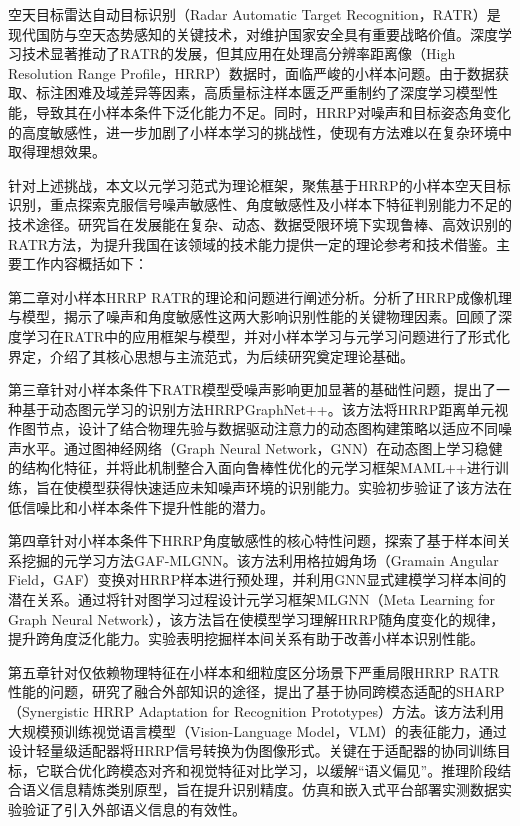 \begin{cabstract}
空天目标雷达自动目标识别（Radar Automatic Target Recognition，RATR）是现代国防与空天态势感知的关键技术，对维护国家安全具有重要战略价值。深度学习技术显著推动了RATR的发展，但其应用在处理高分辨率距离像（High Resolution Range Profile，HRRP）数据时，面临严峻的小样本问题。由于数据获取、标注困难及域差异等因素，高质量标注样本匮乏严重制约了深度学习模型性能，导致其在小样本条件下泛化能力不足。同时，HRRP对噪声和目标姿态角变化的高度敏感性，进一步加剧了小样本学习的挑战性，使现有方法难以在复杂环境中取得理想效果。

针对上述挑战，本文以元学习范式为理论框架，聚焦基于HRRP的小样本空天目标识别，重点探索克服信号噪声敏感性、角度敏感性及小样本下特征判别能力不足的技术途径。研究旨在发展能在复杂、动态、数据受限环境下实现鲁棒、高效识别的RATR方法，为提升我国在该领域的技术能力提供一定的理论参考和技术借鉴。主要工作内容概括如下：

第二章对小样本HRRP RATR的理论和问题进行阐述分析。分析了HRRP成像机理与模型，揭示了噪声和角度敏感性这两大影响识别性能的关键物理因素。回顾了深度学习在RATR中的应用框架与模型，并对小样本学习与元学习问题进行了形式化界定，介绍了其核心思想与主流范式，为后续研究奠定理论基础。

第三章针对小样本条件下RATR模型受噪声影响更加显著的基础性问题，提出了一种基于动态图元学习的识别方法HRRPGraphNet++。该方法将HRRP距离单元视作图节点，设计了结合物理先验与数据驱动注意力的动态图构建策略以适应不同噪声水平。通过图神经网络（Graph Neural Network，GNN）在动态图上学习稳健的结构化特征，并将此机制整合入面向鲁棒性优化的元学习框架MAML++进行训练，旨在使模型获得快速适应未知噪声环境的识别能力。实验初步验证了该方法在低信噪比和小样本条件下提升性能的潜力。

第四章针对小样本条件下HRRP角度敏感性的核心特性问题，探索了基于样本间关系挖掘的元学习方法GAF-MLGNN。该方法利用格拉姆角场（Gramain Angular Field，GAF）变换对HRRP样本进行预处理，并利用GNN显式建模学习样本间的潜在关系。通过将针对图学习过程设计元学习框架MLGNN（Meta Learning for Graph Neural Network），该方法旨在使模型学习理解HRRP随角度变化的规律，提升跨角度泛化能力。实验表明挖掘样本间关系有助于改善小样本识别性能。

第五章针对仅依赖物理特征在小样本和细粒度区分场景下严重局限HRRP RATR性能的问题，研究了融合外部知识的途径，提出了基于协同跨模态适配的SHARP（Synergistic HRRP Adaptation for Recognition Prototypes）方法。该方法利用大规模预训练视觉语言模型（Vision-Language Model，VLM）的表征能力，通过设计轻量级适配器将HRRP信号转换为伪图像形式。关键在于适配器的协同训练目标，它联合优化跨模态对齐和视觉特征对比学习，以缓解“语义偏见”。推理阶段结合语义信息精炼类别原型，旨在提升识别精度。仿真和嵌入式平台部署实测数据实验验证了引入外部语义信息的有效性。

\end{cabstract}


